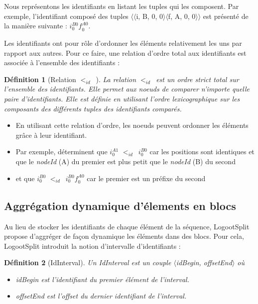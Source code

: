 \documentclass[12pt]{thesul}
\newtheorem{definition}{Définition}
\newcommand{\trm}[1]{\mathit{#1}}
\newcommand{\id}[3]{$\trm{#1}^{\trm{#2}}_{\trm{#3}}$}
\newcommand{\lid}{$<_{id}$~}
\begin{document}

Nous représentons les identifiants en listant les tuples qui les composent.
Par exemple, l'identifiant composé des tuples $\langle\langle$i, B, 0, 0$\rangle\langle$f, A, 0, 0$\rangle\rangle$ est présenté de la manière suivante : \id{i}{B0}{0}\id{f}{A0}{0}.

Les identifiants ont pour rôle d'ordonner les éléments relativement les uns par rapport aux autres.
Pour ce faire, une relation d'ordre total aux identifiants est associée à l'ensemble des identifiants :

\begin{definition}[Relation \lid]
  La relation \lid est un ordre strict total sur l'ensemble des identifiants.
  Elle permet aux noeuds de comparer n'importe quelle paire d'identifiants.
  Elle est définie en utilisant l'ordre lexicographique sur les composants des différents tuples des identifiants comparés.
\end{definition}

\begin{itemize}
  \item En utilisant cette relation d'ordre, les noeuds peuvent ordonner les éléments grâce à leur identifiant.
  \item Par exemple, déterminent que \id{i}{A1}{0} \lid \id{i}{B0}{0} car les positions sont identiques et que le \emph{nodeId} (A) du premier est plus petit que le \emph{nodeId} (B) du second
  \item et que \id{i}{B0}{0} \lid \id{i}{B0}{0}\id{f}{A0}{0} car le premier est un préfixe du second
\end{itemize}


\subsection{Aggrégation dynamique d'élements en blocs}

\label{sec:blocs}

Au lieu de stocker les identifiants de chaque élément de la séquence, LogootSplit propose d'aggréger de façon dynamique les éléments dans des blocs.
Pour cela, LogootSplit introduit la notion d'intervalle d'identifiants :

\begin{definition}[IdInterval]
  Un \emph{IdInterval} est un couple $\langle$idBegin, offsetEnd$\rangle$ où
  \begin{itemize}
    \item idBegin est l'identifiant du premier élément de l'interval.
    \item offsetEnd est l'offset du dernier identifiant de l'interval.
  \end{itemize}
\end{definition}
\end{document}
